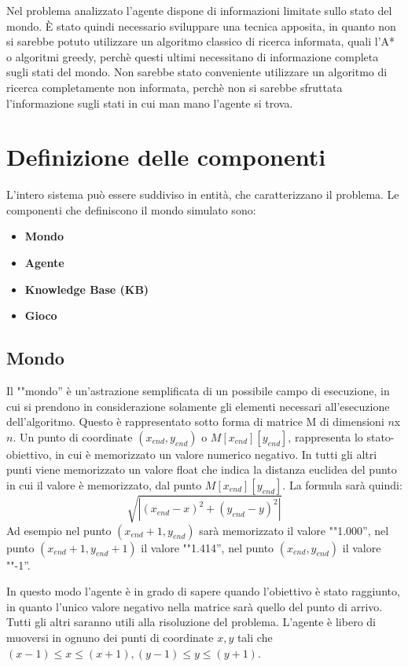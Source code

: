 Nel problema analizzato l'agente dispone di informazioni limitate sullo stato del mondo. È stato quindi necessario sviluppare una tecnica apposita, in quanto non si sarebbe potuto utilizzare un algoritmo classico di ricerca informata, quali l'A* o algoritmi greedy, perchè questi ultimi necessitano di informazione completa sugli stati del mondo. Non sarebbe stato conveniente utilizzare un algoritmo di ricerca completamente non informata, perchè non si sarebbe sfruttata l'informazione sugli stati in cui man mano l'agente si trova.


\section{Definizione delle componenti}
L'intero sistema può essere suddiviso in entità, che caratterizzano il problema. 
Le componenti che definiscono il mondo simulato sono:
\begin{itemize}
\item \textbf{Mondo}

\item \textbf{Agente}

\item \textbf{Knowledge Base (KB)}

\item \textbf{Gioco} 	
\end{itemize}

\subsection{Mondo}
Il ""mondo'' è un'astrazione semplificata di un possibile campo di esecuzione, in cui si prendono in considerazione solamente gli elementi necessari all'esecuzione dell'algoritmo. Questo è rappresentato sotto forma di matrice M di dimensioni $n$x$n$. Un punto di coordinate $(x_{end}, y_{end})$ o $M[x_{end}][y_{end}]$, rappresenta lo stato-obiettivo, in cui è memorizzato un valore numerico negativo. In tutti gli altri punti viene memorizzato un valore float che indica la distanza euclidea del punto in cui il valore è memorizzato, dal punto $M[x_{end}][y_{end}]$. La formula sarà quindi:
$$\sqrt{|(x_{end} - x)^2 + (y_{end} - y)^2|}$$
Ad esempio nel punto $(x_{end}+1, y_{end})$ sarà memorizzato il valore ""1.000'', nel punto $(x_{end}+1, y_{end}+1)$ il valore ""1.414'', nel punto $(x_{end}, y_{end})$ il valore ""-1''. 

In questo modo l'agente è in grado di sapere quando l'obiettivo è stato raggiunto, in quanto l'unico valore negativo nella matrice sarà quello del punto di arrivo. Tutti gli altri saranno utili alla risoluzione del problema.
L'agente è libero di muoversi in ognuno dei punti di coordinate $ x, y $ tali che $ (x-1) \le x \le (x+1), (y-1) \le y \le (y+1) $.

